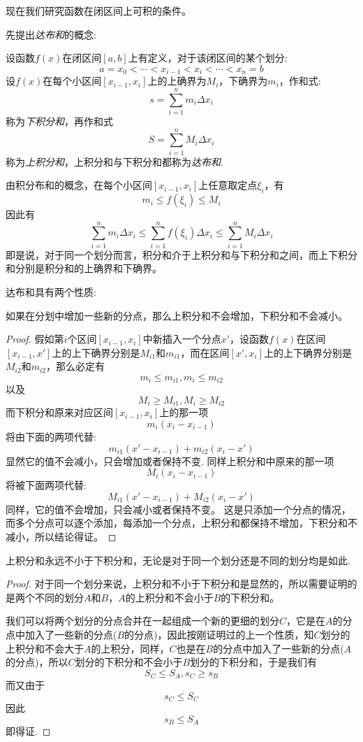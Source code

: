 现在我们研究函数在闭区间上可积的条件。

先提出\emph{达布和}的概念:
\begin{definition}
  设函数$f(x)$在闭区间$[a,b]$上有定义，对于该闭区间的某个划分:
  \[ a=x_0 < \cdots < x_{i-1} < x_i < \cdots < x_n = b \]
  设$f(x)$在每个小区间$[x_{i-1},x_i]$上的上确界为$M_i$，下确界为$m_i$，作和式:
  \[ s = \sum_{i=1}^n m_i \Delta x_i \]
  称为\emph{下积分和}，再作和式
  \[ S = \sum_{i=1}^n M_i \Delta x_i \]
  称为\emph{上积分和}，上积分和与下积分和都称为\emph{达布和}.
\end{definition}

由积分布和的概念，在每个小区间$[x_{i-1},x_i]$上任意取定点$\xi_i$，有
\[ m_i \leqslant f(\xi_i) \leqslant M_i \]
因此有
\[ \sum_{i=1}^n m_i \Delta x_i \leqslant \sum_{i=1}^n f(\xi_i) \Delta x_i \leqslant \sum_{i=1}^n M_i \Delta x_i \]
即是说，对于同一个划分而言，积分和介于上积分和与下积分和之间，而上下积分和分别是积分和的上确界和下确界。

达布和具有两个性质:

\begin{property}
  如果在分划中增加一些新的分点，那么上积分和不会增加，下积分和不会减小。
\end{property}

\begin{proof}
  假如第$i$个区间$[x_{i-1},x_i]$中新插入一个分点$x'$，设函数$f(x)$在区间$[x_{i-1},x']$上的上下确界分别是$M_{i1}$和$m_{i1}$，而在区间$[x',x_i]$上的上下确界分别是$M_{i2}$和$m_{i2}$，那么必定有
  \[ m_i \leqslant m_{i1}, m_i \leqslant m_{i2} \]
  以及
  \[ M_i \geqslant M_{i1}, M_i \geqslant M_{i2} \]
  而下积分和原来对应区间$[x_{i-1},x_i]$上的那一项
  \[ m_i (x_i-x_{i-1}) \]
  将由下面的两项代替:
  \[ m_{i1}(x'-x_{i-1})+m_{i2}(x_i-x') \]
  显然它的值不会减小，只会增加或者保持不变. 同样上积分和中原来的那一项
  \[ M_i(x_i-x_{i-1}) \]
  将被下面两项代替:
  \[ M_{i1}(x'-x_{i-1}) + M_{i2}(x_i-x') \]
  同样，它的值不会增加，只会减小或者保持不变。
  这是只添加一个分点的情况，而多个分点可以逐个添加，每添加一个分点，上积分和都保持不增加，下积分和不减小，所以结论得证。
\end{proof}

\begin{property}
上积分和永远不小于下积分和，无论是对于同一个划分还是不同的划分均是如此.
\end{property}

\begin{proof}
  对于同一个划分来说，上积分和不小于下积分和是显然的，所以需要证明的是两个不同的划分$A$和$B$，$A$的上积分和不会小于$B$的下积分和。

  我们可以将两个划分的分点合并在一起组成一个新的更细的划分$C$，它是在$A$的分点中加入了一些新的分点($B$的分点)，因此按刚证明过的上一个性质，知$C$划分的上积分和不会大于$A$的上积分，同样，$C$也是在$B$的分点中加入了一些新的分点($A$的分点)，所以$C$划分的下积分和不会小于$B$划分的下积分和，于是我们有
  \[ S_C \leqslant S_A, s_C \geqslant s_B \]
  而又由于
  \[ s_C \leqslant S_C \]
  因此
  \[ s_B \leqslant S_A \]
  即得证.
\end{proof}

